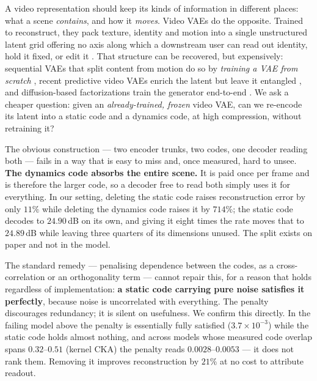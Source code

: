 
A video representation should keep its kinds of information in different places: what a
scene \emph{contains}, and how it \emph{moves}. Video VAEs do the opposite. Trained to
reconstruct, they pack texture, identity and motion into a single unstructured latent
grid offering no axis along which a downstream user can read out identity, hold it
fixed, or edit it \citep{videomae,vjepa}. That structure can be recovered, but
expensively: sequential VAEs that split content from motion do so by \emph{training a
VAE from scratch} \citep{s3vae,cdsvae,vidtwin}, recent predictive video VAEs enrich the
latent but leave it entangled \citep{pvvae}, and diffusion-based factorizations train
the generator end-to-end \citep{divid}. We ask a cheaper question: given an
\emph{already-trained, frozen} video VAE, can we re-encode its latent into a static code
and a dynamics code, at high compression, without retraining it?

The obvious construction --- two encoder trunks, two codes, one decoder reading both ---
fails in a way that is easy to miss and, once measured, hard to unsee. \textbf{The
dynamics code absorbs the entire scene.} It is paid once per frame and is therefore the
larger code, so a decoder free to read both simply uses it for everything. In our
setting, deleting the static code raises reconstruction error by only $11\%$ while
deleting the dynamics code raises it by $714\%$; the static code decodes to $24.90$\,dB
on its own, and giving it eight times the rate moves that to $24.89$\,dB while leaving
three quarters of its dimensions unused. The split exists on paper and not in the model.

The standard remedy --- penalising dependence between the codes, as a
cross-correlation or an orthogonality term --- cannot repair this, for a reason that
holds regardless of implementation: \textbf{a static code carrying pure noise satisfies
it perfectly}, because noise is uncorrelated with everything. The penalty discourages
redundancy; it is silent on usefulness. We confirm this directly. In the failing model
above the penalty is essentially fully satisfied ($3.7\times 10^{-3}$) while the static
code holds almost nothing, and across models whose measured code overlap spans
$0.32$--$0.51$ (kernel CKA) the penalty reads $0.0028$--$0.0053$ --- it does not rank
them. Removing it improves reconstruction by $21\%$ at no cost to attribute readout.

